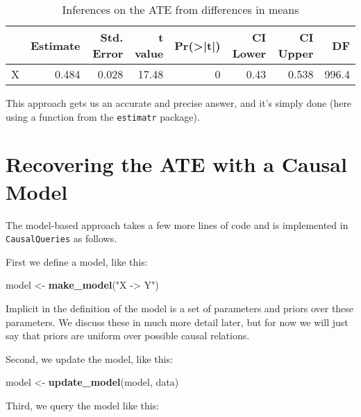 \documentclass[
  12pt,
]{book}
\newenvironment{Shaded}{\begin{snugshade}}{\end{snugshade}}
\newcommand{\FunctionTok}[1]{\textcolor[rgb]{0.13,0.29,0.53}{\textbf{#1}}}
\newcommand{\NormalTok}[1]{#1}
\newcommand{\OtherTok}[1]{\textcolor[rgb]{0.56,0.35,0.01}{#1}}
\newcommand{\StringTok}[1]{\textcolor[rgb]{0.31,0.60,0.02}{#1}}
\begin{document}
\begin{table}

\caption{\label{tab:unnamed-chunk-5}Inferences on the ATE from differences in means}
\centering
\begin{tabular}[t]{l|r|r|r|r|r|r|r}
\hline
  & Estimate & Std. Error & t value & Pr(>|t|) & CI Lower & CI Upper & DF\\
\hline
X & 0.484 & 0.028 & 17.48 & 0 & 0.43 & 0.538 & 996.4\\
\hline
\end{tabular}
\end{table}

This approach gets us an accurate and precise answer, and it's simply done (here using a function from the \texttt{estimatr} package).

\hypertarget{recovering-the-ate-with-a-causal-model}{%
\section{Recovering the ATE with a Causal Model}\label{recovering-the-ate-with-a-causal-model}}

The model-based approach takes a few more lines of code and is implemented in \texttt{CausalQueries} as follows.

First we define a model, like this:

\begin{Shaded}
\begin{Highlighting}[]
\NormalTok{model }\OtherTok{\textless{}{-}} \FunctionTok{make\_model}\NormalTok{(}\StringTok{"X {-}\textgreater{} Y"}\NormalTok{)}
\end{Highlighting}
\end{Shaded}

Implicit in the definition of the model is a set of parameters and priors over these parameters. We discuss these in much more detail later, but for now we will just say that priors are uniform over possible causal relations.

Second, we update the model, like this:

\begin{Shaded}
\begin{Highlighting}[]
\NormalTok{model }\OtherTok{\textless{}{-}} \FunctionTok{update\_model}\NormalTok{(model, data) }
\end{Highlighting}
\end{Shaded}

Third, we query the model like this:
\end{document}
